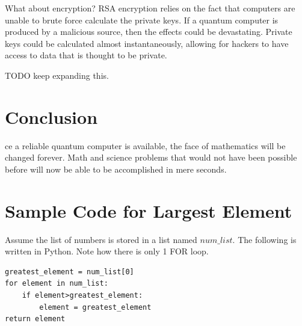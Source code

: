 \documentclass[10pt,journal,compsoc]{IEEEtran}
\begin{document}
What about encryption? RSA encryption relies on the fact that computers are unable to brute force calculate the private keys. If a quantum computer is produced by a malicious source, then the effects could be devastating. Private keys could be calculated almost instantaneously, allowing for hackers to have access to data that is thought to be private.

TODO keep expanding this. 


\section{Conclusion}
ce a reliable quantum computer is available, the face of mathematics will be changed forever. Math and science problems that would not have been possible before will now be able to be accomplished in mere seconds. 



%


\appendices
\section{Sample Code for Largest Element}
Assume the list of numbers is stored in a list named $num\_list$. The following is written in Python. Note how there is only 1 FOR loop.
\begin{lstlisting}
greatest_element = num_list[0]
for element in num_list:
	if element>greatest_element:
		element = greatest_element
return element

\end{lstlisting}
\end{document}
